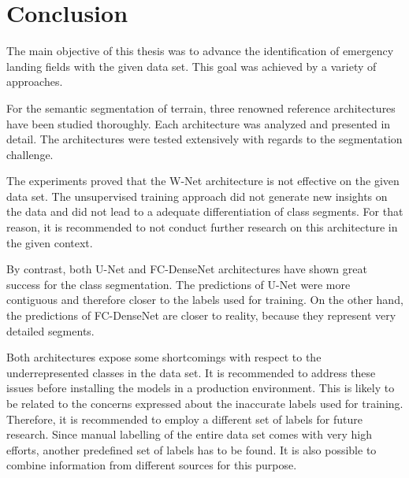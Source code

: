 \section{Conclusion}
The main objective of this thesis was to advance the identification of emergency landing fields with the given data set. This goal was achieved by a variety of approaches.

For the semantic segmentation of terrain, three renowned reference architectures have been studied thoroughly. Each architecture was analyzed and presented in detail. The architectures were tested extensively with regards to the segmentation challenge. 

The experiments proved that the W-Net architecture is not effective on the given data set. The unsupervised training approach did not generate new insights on the data and did not lead to a adequate differentiation of class segments. For that reason, it is recommended to not conduct further research on this architecture in the given context.

By contrast, both U-Net and FC-DenseNet architectures have shown great success for the class segmentation. The predictions of U-Net were more contiguous and therefore closer to the labels used for training. On the other hand, the predictions of FC-DenseNet are closer to reality, because they represent very detailed segments. 

Both architectures expose some shortcomings with respect to the underrepresented classes in the data set. It is recommended to address these issues before installing the models in a production environment. This is likely to be related to the concerns expressed about the inaccurate labels used for training. Therefore, it is recommended to employ a different set of labels for future research. Since manual labelling of the entire data set comes with very high efforts, another predefined set of labels has to be found. It is also possible to combine information from different sources for  this purpose.  

